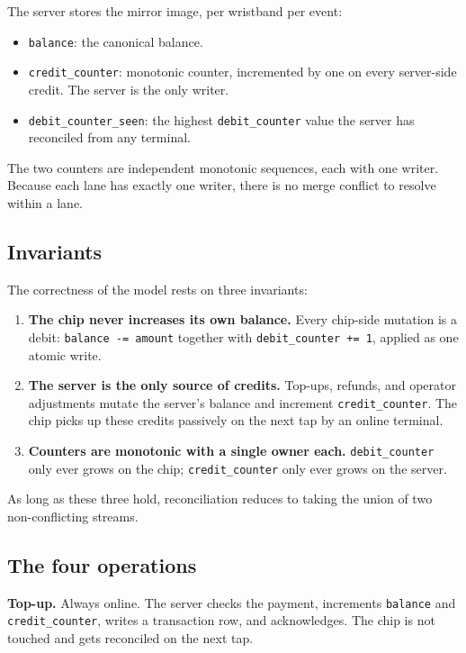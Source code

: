The server stores the mirror image, per wristband per event:
\begin{itemize}
	\item \texttt{balance}: the canonical balance.
	\item \texttt{credit\_counter}: monotonic counter, incremented by one on every server-side credit. The server is the only writer.
	\item \texttt{debit\_counter\_seen}: the highest \texttt{debit\_counter} value the server has reconciled from any terminal.
\end{itemize}

The two counters are independent monotonic sequences, each with one writer. Because each lane has exactly one writer, there is no merge conflict to resolve within a lane.

\subsection{Invariants}
\label{subsec:reconciliation-invariants}

The correctness of the model rests on three invariants:

\begin{enumerate}
	\item \textbf{The chip never increases its own balance.} Every chip-side mutation is a debit: \texttt{balance -= amount} together with \texttt{debit\_counter += 1}, applied as one atomic write.
	\item \textbf{The server is the only source of credits.} Top-ups, refunds, and operator adjustments mutate the server's balance and increment \texttt{credit\_counter}. The chip picks up these credits passively on the next tap by an online terminal.
	\item \textbf{Counters are monotonic with a single owner each.} \texttt{debit\_counter} only ever grows on the chip; \texttt{credit\_counter} only ever grows on the server.
\end{enumerate}

As long as these three hold, reconciliation reduces to taking the union of two non-conflicting streams.

\subsection{The four operations}
\label{subsec:reconciliation-ops}

\textbf{Top-up.} Always online. The server checks the payment, increments \texttt{balance} and \texttt{credit\_counter}, writes a transaction row, and acknowledges. The chip is not touched and gets reconciled on the next tap.

